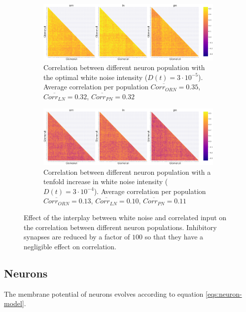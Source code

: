     \begin{figure}
      \centering
      \begin{subfigure}[t]{\textwidth}
        \centering
        \includegraphics[width=\textwidth]{correlation-hundreth-poisson}
        \caption{Correlation between different neuron population with the optimal white noise intensity ($D(t) = 3\cdot 10^{-5}$). Average correlation per population $\overline{Corr_{ORN}} = 0.35$, $\overline{Corr_{LN}} = 0.32$, $\overline{Corr_{PN}} = 0.32$}
      \end{subfigure}
      \begin{subfigure}[t]{\textwidth}
        \includegraphics[width=\textwidth]{correlation-hundreth-poisson-increased-noise}
        \caption{Correlation between different neuron population with a tenfold increase in white noise intensity ($D(t) = 3\cdot 10^{-4}$). Average correlation per population $\overline{Corr_{ORN}} = 0.13$, $\overline{Corr_{LN}} = 0.10$, $\overline{Corr_{PN}} = 0.11$}
      \end{subfigure}
      \caption{Effect of the interplay between white noise and correlated input on the correlation between different neuron populations. Inhibitory synapses are reduced by a factor of $100$ so that they have a negligible effect on correlation.}
      \label{fig:increasing-white-noise}
    \end{figure}

  \subsection{Neurons}
  The membrane potential of neurons evolves according to equation \ref{eqs:neuron-model}.

